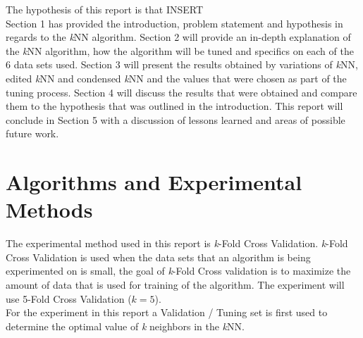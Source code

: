 \documentclass[twoside,11pt]{article}
\begin{document}
\hspace*{10mm} The hypothesis of this report is that INSERT\\

\hspace*{10mm} Section 1 has provided the introduction, problem statement and hypothesis in regards to the \textit{k}NN algorithm. Section 2 will provide an in-depth explanation of the \textit{k}NN algorithm, how the algorithm will be tuned and specifics on each of the 6 data sets used. Section 3 will present the results obtained by variations of \textit{k}NN, edited \textit{k}NN and condensed \textit{k}NN and the values that were chosen as part of the tuning process. Section 4 will discuss the results that were obtained and compare them to the hypothesis that was outlined in the introduction. This report will conclude in Section 5 with a discussion of lessons learned and areas of possible future work.\newline



\section{Algorithms and Experimental Methods}
The experimental method used in this report is \textit{k}-Fold Cross Validation. \textit{k}-Fold Cross Validation is used when the data sets that an algorithm is being experimented on is small, the goal of \textit{k}-Fold Cross validation is to maximize the amount of data that is used for training of the algorithm. The experiment will use 5-Fold Cross Validation ($\textit{k} = 5$).\\ 
For the experiment in this report a Validation / Tuning set is first used to determine the optimal value of \textit{k} neighbors in the \textit{k}NN.\\ 
\end{document}
